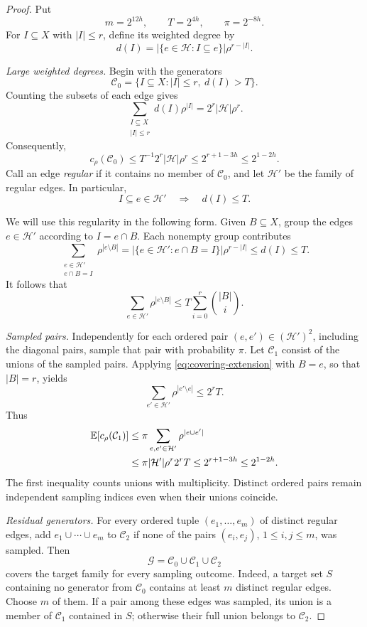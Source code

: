\begin{proof}
Put
\[
m=2^{12h},\qquad T=2^{4h},\qquad \pi=2^{-8h}.
\]
For \(I\subseteq X\) with \(|I|\le r\), define its weighted degree by
\[
d(I)=|\{e\in\mathcal H:I\subseteq e\}|\rho^{r-|I|}.
\]

\emph{Large weighted degrees.}
Begin with the generators
\[
\mathcal C_0=\{I\subseteq X:|I|\le r,\ d(I)>T\}.
\]
Counting the subsets of each edge gives
\[
\sum_{\substack{I\subseteq X\\|I|\le r}}d(I)\rho^{|I|}
=2^r|\mathcal H|\rho^r.
\]
Consequently,
\begin{equation}\label{eq:covering-initial-cost}
c_\rho(\mathcal C_0)
\le T^{-1}2^r|\mathcal H|\rho^r
\le2^{r+1-3h}\le2^{1-2h}.
\end{equation}
Call an edge \emph{regular} if it contains no member of \(\mathcal C_0\),
and let \(\mathcal H'\) be the family of regular edges. In particular,
\[
I\subseteq e\in\mathcal H'
\quad\Longrightarrow\quad d(I)\le T.
\]

We will use this regularity in the following form. Given \(B\subseteq X\),
group the edges \(e\in\mathcal H'\) according to \(I=e\cap B\).
Each nonempty group contributes
\[
\sum_{\substack{e\in\mathcal H'\\e\cap B=I}}
  \rho^{|e\setminus B|}
=|\{e\in\mathcal H':e\cap B=I\}|\rho^{r-|I|}
\le d(I)\le T.
\]
It follows that
\begin{equation}\label{eq:covering-extension}
\sum_{e\in\mathcal H'}\rho^{|e\setminus B|}
\le T\sum_{i=0}^r\binom{|B|}{i}.
\end{equation}

\emph{Sampled pairs.}
Independently for each ordered pair \((e,e')\in(\mathcal H')^2\),
including the diagonal pairs, sample that pair with probability \(\pi\).
Let \(\mathcal C_1\) consist of the unions of the sampled pairs. Applying
\eqref{eq:covering-extension} with \(B=e\), so that \(|B|=r\), yields
\[
\sum_{e'\in\mathcal H'}\rho^{|e'\setminus e|}\le2^rT.
\]
Thus
\begin{align}
\mathbb E[c_\rho(\mathcal C_1)]
&\le\pi\sum_{e,e'\in\mathcal H'}\rho^{|e\cup e'|}
\notag\\
&\le\pi|\mathcal H'|\rho^r2^rT
\le2^{r+1-3h}\le2^{1-2h}.
\label{eq:covering-pair-cost}
\end{align}
The first inequality counts unions with multiplicity. Distinct ordered
pairs remain independent sampling indices even when their unions coincide.

\emph{Residual generators.}
For every ordered tuple \((e_1,\ldots,e_m)\) of distinct regular edges,
add \(e_1\cup\cdots\cup e_m\) to \(\mathcal C_2\) if none of the pairs
\((e_i,e_j)\), \(1\le i,j\le m\), was sampled.
Then
\[
\mathcal G=\mathcal C_0\cup\mathcal C_1\cup\mathcal C_2
\]
covers the target family for every sampling outcome. Indeed, a target set
\(S\) containing no generator from \(\mathcal C_0\) contains at least \(m\)
distinct regular edges. Choose \(m\) of them. If a pair among these edges
was sampled, its union is a member of \(\mathcal C_1\) contained in \(S\);
otherwise their full union belongs to \(\mathcal C_2\).


\end{proof}
